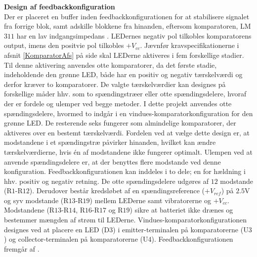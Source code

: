 \noindent\textbf{Design af feedbackkonfiguration} \\
Der er placeret en buffer inden feedbackkonfigurationen for at stabilisere signalet fra forrige blok, samt adskille blokkene fra hinanden, eftersom komparatoren, LM$311$ har en lav indgangsimpedans \cite{Instruments2015}. LEDernes negativ pol tilkobles komparatorens output, imens den positvie pol tilkobles $+V_{cc}$. Jævnfør kravspecifikationerne i afsnit \ref{KomparatorAfs} på side \pageref{KomparatorAfs} skal LEDerne aktiveres i fem forskellige stadier. Til denne aktivering anvendes otte komparatorer, da det første stadie, indeholdende den grønne LED, både har en positiv og negativ tærskelværdi og derfor kræver to komparatorer. De valgte tærskelværdier kan designes på forskellige måder hhv. som to spændingstræer eller otte spændingsdelere, hvoraf der er fordele og ulemper ved begge metoder. I dette projekt anvendes otte spændingsdelere, hvormed to indgår i en vindues-komparatorkonfiguration for den grønne LED. De resterende seks fungerer som almindelige komparatorer, der aktiveres over en bestemt tærskelværdi. Fordelen ved at vælge dette design er, at modstandene i et spændingstræ påvirker hinanden, hvilket kan ændre tærskelværdierne, hvis én af modstandene ikke fungerer optimalt. Ulempen ved at anvende spændingsdelere er, at der benyttes flere modstande ved denne konfiguration. Feedbackkonfigurationen kan inddeles i to dele; en for hældning i hhv. positiv og negativ retning. De otte spændingsdelere udgøres af $12$ modstande (R$1$-R$12$). Derudover består kredsløbet af en spændingsreference ($+V_{ref}$) på $2.5$V og syv modstande (R$13$-R$19$) mellem LEDerne samt vibratorerne og $+V_{cc}$. Modstandene (R$13$-R$14$, R$16$-R$17$ og R$19$) sikre at batteriet ikke drænes og bestemmer mængden af strøm til LEDerne. Vindues-komparatorkonfigurationen designes ved at placere en LED (D$3$) i emitter-terminalen på komparatorerne (U$3$) og collector-terminalen på komparatorerne (U$4$). Feedbackkonfigurationen fremgår af . 


